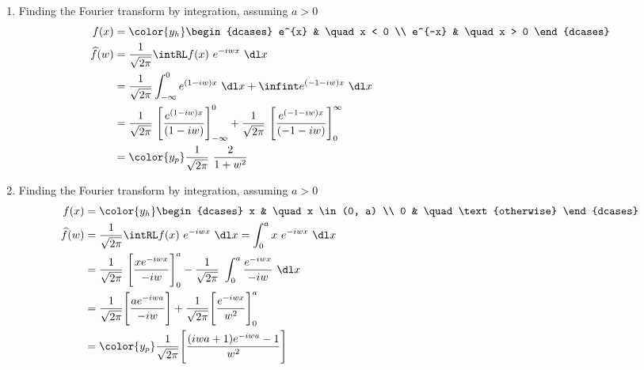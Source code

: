 \begin{enumerate}
    \item Finding the Fourier transform by integration, assuming $ a > 0 $
          \begin{align}
              f(x)           & = \color{y_h}\begin{dcases}
                                                e^{x}  & \quad x < 0 \\
                                                e^{-x} & \quad x > 0
                                            \end{dcases}                      \\
              \widehat{f}(w) & = \frac{1}{\sqrt{2\pi}} \intRL f(x)\ e^{-iwx}\ \dl x   \\
                             & = \frac{1}{\sqrt{2\pi}} \int_{-\infty}^{0}
              e^{(1-iw)x} \ \dl x + \infint e^{(-1-iw)x}\ \dl x                       \\
                             & = \frac{1}{\sqrt{2\pi}}\ \Bigg[ \frac{e^{(1-iw)x}}
                  {(1-iw)} \Bigg]_{-\infty}^{0} + \frac{1}{\sqrt{2\pi}}\
              \Bigg[ \frac{e^{(-1-iw)x}}{(-1-iw)} \Bigg]_{0}^{\infty}                 \\
                             & = \color{y_p} \frac{1}{\sqrt{2\pi}}\ \frac{2}{1 + w^2}
          \end{align}

    \item Finding the Fourier transform by integration, assuming $ a > 0 $
          \begin{align}
              f(x)           & = \color{y_h}\begin{dcases}
                                                x & \quad x \in (0, a)     \\
                                                0 & \quad \text{otherwise}
                                            \end{dcases}               \\
              \widehat{f}(w) & = \frac{1}{\sqrt{2\pi}} \intRL f(x)\ e^{-iwx}\ \dl x
              = \int_{0}^{a} x\ e^{-iwx}\ \dl x                                      \\
                             & = \frac{1}{\sqrt{2\pi}}\ \Bigg[ \frac{xe^{-iwx}}{-iw}
                  \Bigg]_{0}^{a} - \frac{1}{\sqrt{2\pi}}\
              \int_{0}^{a} \frac{e^{-iwx}}{-iw}\ \dl x                               \\
                             & = \frac{1}{\sqrt{2\pi}} \Bigg[ \frac{ae^{-iwa}}{-iw}
                  \Bigg]
              + \frac{1}{\sqrt{2\pi}} \Bigg[\frac{e^{-iwx}}{w^2}\Bigg]_0^a           \\
                             & = \color{y_p} \frac{1}{\sqrt{2\pi}} \Bigg[
                  \frac{(iwa + 1)e^{-iwa} - 1}{w^2} \Bigg]
          \end{align}


\end{enumerate}
